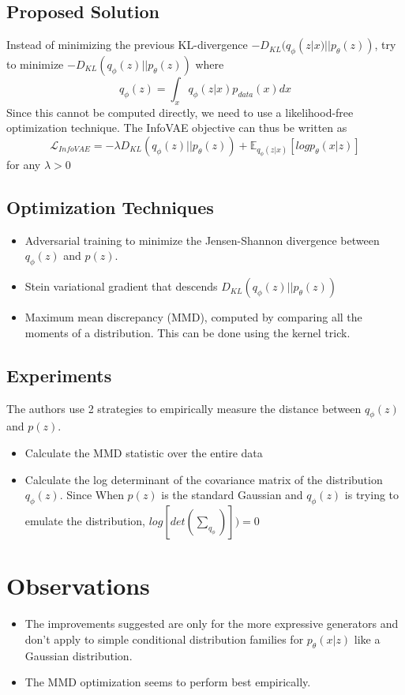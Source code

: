\documentclass[12pt]{article}
\begin{document}
  \subsection{Proposed Solution}
    Instead of minimizing the previous KL-divergence $- D_{KL}(q_{\phi}(z|x) || p_{\theta}(z))$, try to minimize $- D_{KL}(q_{\phi}(z) || p_{\theta}(z))$ where $$q_{\phi}(z) = \int_{x} q_{\phi}(z|x) p_{data}(x) dx $$
    Since this cannot be computed directly, we need to use a likelihood-free optimization technique. The InfoVAE objective can thus be written as 
    \begin{equation*}
      \mathcal{L}_{InfoVAE} = - \lambda D_{KL}(q_{\phi}(z) || p_{\theta}(z)) + \mathbb{E}_{q_{\phi}(z|x)} [log p_{\theta}(x|z)]
    \end{equation*}
    for any $\lambda > 0$

  \subsection{Optimization Techniques}
    \begin{itemize}
      \item Adversarial training to minimize the Jensen-Shannon divergence between $q_{\phi}(z)$ and $p(z)$.
      \item Stein variational gradient that descends $D_{KL}(q_{\phi}(z) || p_{\theta}(z))$
      \item Maximum mean discrepancy (MMD), computed by comparing all the moments of a distribution. This can be done using the kernel trick.
    \end{itemize}

  \subsection{Experiments}
    The authors use 2 strategies to empirically measure the distance between $q_{\phi}(z)$ and $p(z)$.
    \begin{itemize}
      \item Calculate the MMD statistic over the entire data
      \item Calculate the log determinant of the covariance matrix of the distribution $q_{\phi}(z)$. Since When $p(z)$ is the standard Gaussian and $q_{\phi}(z)$ is trying to emulate the distribution, $log[det (\sum_{q_{\phi}})]) = 0$
    \end{itemize}

\section{Observations}
  \begin{itemize}
    \item The improvements suggested are only for the more expressive generators and don't apply to simple conditional distribution families for $p_{\theta} (x|z)$ like a Gaussian distribution.
    \item The MMD optimization seems to perform best empirically.
  \end{itemize}



\end{document}
